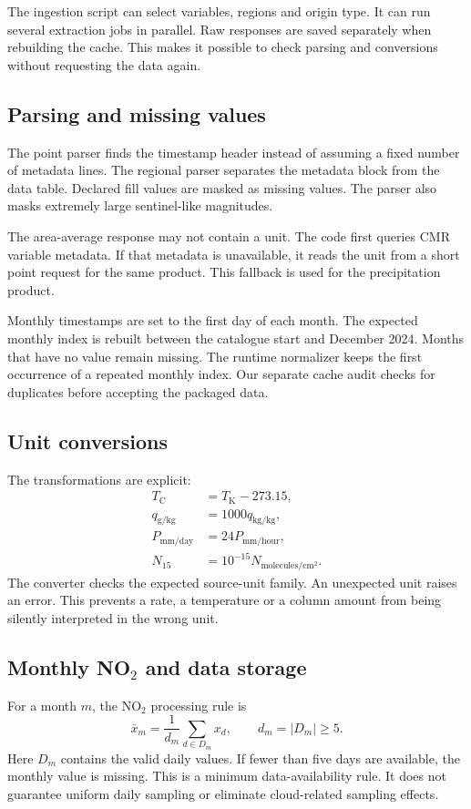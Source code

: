 \documentclass[10pt,a4paper,twocolumn]{article}
\begin{document}
The ingestion script can select variables, regions and origin type. It can run several extraction jobs in parallel. Raw responses are saved separately when rebuilding the cache. This makes it possible to check parsing and conversions without requesting the data again.

\subsection{Parsing and missing values}
The point parser finds the timestamp header instead of assuming a fixed number of metadata lines. The regional parser separates the metadata block from the data table. Declared fill values are masked as missing values. The parser also masks extremely large sentinel-like magnitudes.

The area-average response may not contain a unit. The code first queries CMR variable metadata. If that metadata is unavailable, it reads the unit from a short point request for the same product. This fallback is used for the precipitation product.

Monthly timestamps are set to the first day of each month. The expected monthly index is rebuilt between the catalogue start and December 2024. Months that have no value remain missing. The runtime normalizer keeps the first occurrence of a repeated monthly index. Our separate cache audit checks for duplicates before accepting the packaged data.

\subsection{Unit conversions}
The transformations are explicit:
\begin{align}
T_{\mathrm{C}} &= T_{\mathrm{K}}-273.15,\\
q_{\mathrm{g/kg}} &= 1000q_{\mathrm{kg/kg}},\\
P_{\mathrm{mm/day}} &= 24P_{\mathrm{mm/hour}},\\
N_{15} &= 10^{-15}N_{\mathrm{molecules/cm^2}}.
\end{align}
The converter checks the expected source-unit family. An unexpected unit raises an error. This prevents a rate, a temperature or a column amount from being silently interpreted in the wrong unit.

\subsection{Monthly NO$_2$ and data storage}
For a month $m$, the NO$_2$ processing rule is
\begin{equation}
\bar x_m=\frac{1}{d_m}\sum_{d\in D_m}x_d,
\qquad d_m=|D_m|\geq5.
\end{equation}
Here $D_m$ contains the valid daily values. If fewer than five days are available, the monthly value is missing. This is a minimum data-availability rule. It does not guarantee uniform daily sampling or eliminate cloud-related sampling effects.
\end{document}
